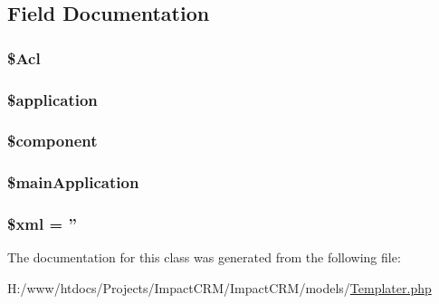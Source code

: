 \subsection{Field Documentation}
\hypertarget{classTemplater_aa06e64fd19a6d82d290ec197a8e65148}{
\subsubsection[{\$Acl}]{\setlength{\rightskip}{0pt plus 5cm}\${\bf Acl}}}
\label{classTemplater_aa06e64fd19a6d82d290ec197a8e65148}
\hypertarget{classTemplater_a537fa9b460dddc2a67074faab810398a}{
\subsubsection[{\$application}]{\setlength{\rightskip}{0pt plus 5cm}\$application}}
\label{classTemplater_a537fa9b460dddc2a67074faab810398a}
\hypertarget{classTemplater_a211527c21ba56109545060b49b628e59}{
\subsubsection[{\$component}]{\setlength{\rightskip}{0pt plus 5cm}\$component}}
\label{classTemplater_a211527c21ba56109545060b49b628e59}
\hypertarget{classTemplater_a83952ded4d59c57271c0cb128f7feb26}{
\subsubsection[{\$mainApplication}]{\setlength{\rightskip}{0pt plus 5cm}\$mainApplication}}
\label{classTemplater_a83952ded4d59c57271c0cb128f7feb26}
\hypertarget{classTemplater_aa108d9d91e700ac530401dd363b0723b}{
\subsubsection[{\$xml}]{\setlength{\rightskip}{0pt plus 5cm}\$xml = ''}}
\label{classTemplater_aa108d9d91e700ac530401dd363b0723b}


The documentation for this class was generated from the following file:\begin{DoxyCompactItemize}
\item 
H:/www/htdocs/Projects/ImpactCRM/ImpactCRM/models/\hyperlink{Templater_8php}{Templater.php}\end{DoxyCompactItemize}
